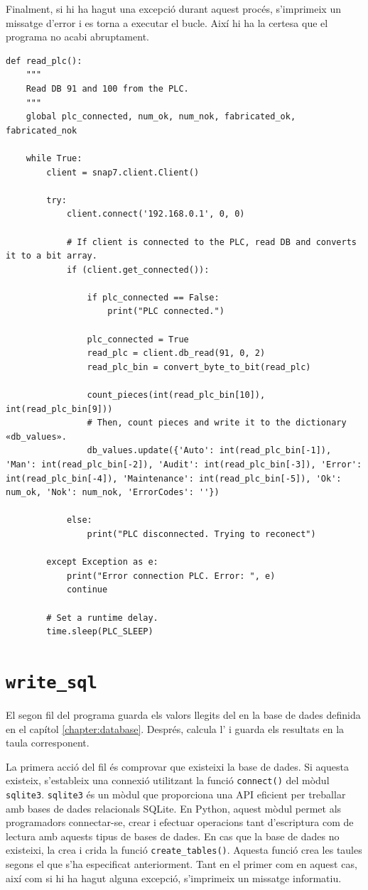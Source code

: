 \documentclass{tfgitic}[2022/06/30]
\begin{document}
Finalment, si hi ha hagut una excepció durant aquest procés, s'imprimeix un missatge d'error i es torna a executar el bucle. Així hi ha la certesa que el programa no acabi abruptament.

\begin{lstlisting}[style=Python]
def read_plc():
    """
    Read DB 91 and 100 from the PLC.
    """
    global plc_connected, num_ok, num_nok, fabricated_ok, fabricated_nok

    while True:
        client = snap7.client.Client()

        try:
            client.connect('192.168.0.1', 0, 0)

            # If client is connected to the PLC, read DB and converts it to a bit array.
            if (client.get_connected()):
            
                if plc_connected == False:
                    print("PLC connected.")
                    
                plc_connected = True
                read_plc = client.db_read(91, 0, 2)
                read_plc_bin = convert_byte_to_bit(read_plc)
                
                count_pieces(int(read_plc_bin[10]), int(read_plc_bin[9]))
                # Then, count pieces and write it to the dictionary «db_values».
                db_values.update({'Auto': int(read_plc_bin[-1]), 'Man': int(read_plc_bin[-2]), 'Audit': int(read_plc_bin[-3]), 'Error': int(read_plc_bin[-4]), 'Maintenance': int(read_plc_bin[-5]), 'Ok': num_ok, 'Nok': num_nok, 'ErrorCodes': ''})
                
            else:
                print("PLC disconnected. Trying to reconect")

        except Exception as e:
            print("Error connection PLC. Error: ", e)
            continue

        # Set a runtime delay.
        time.sleep(PLC_SLEEP)
\end{lstlisting}

\section{\texttt{write\_sql}}
\label{section:writesql}
El segon fil del programa guarda els valors llegits del  en la base de dades definida en el capítol \ref{chapter:database}. Després, calcula l' i guarda els resultats en la taula corresponent.

La primera acció del fil és comprovar que existeixi la base de dades. Si aquesta existeix, s'estableix una connexió utilitzant la funció \texttt{connect()} del mòdul \texttt{sqlite3}. \texttt{sqlite3} és un mòdul que proporciona una API eficient per treballar amb bases de dades relacionals SQLite. En Python, aquest mòdul permet als programadors connectar-se, crear i efectuar operacions tant d'escriptura com de lectura amb aquests tipus de bases de dades. En cas que la base de dades no existeixi, la crea i crida la funció \texttt{create\_tables()}. Aquesta funció crea les taules segons el que s'ha especificat anteriorment. Tant en el primer com en aquest cas, així com si hi ha hagut alguna excepció, s'imprimeix un missatge informatiu.
\end{document}
